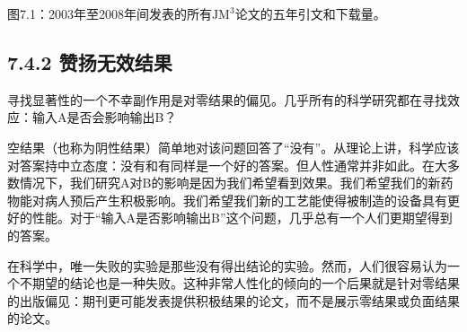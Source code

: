 图7.1：2003年至2008年间发表的所有$\mathrm{JM}^{3}$论文的五年引文和下载量。

\subsection*{7.4.2 赞扬无效结果}
寻找显著性的一个不幸副作用是对零结果的偏见。几乎所有的科学研究都在寻找效应：输入A是否会影响输出B？

空结果（也称为阴性结果）简单地对该问题回答了“没有”。从理论上讲，科学应该对答案持中立态度：没有和有同样是一个好的答案。但人性通常并非如此。在大多数情况下，我们研究A对B的影响是因为我们希望看到效果。我们希望我们的新药物能对病人预后产生积极影响。我们希望我们新的工艺能使得被制造的设备具有更好的性能。对于“输入A是否影响输出B”这个问题，几乎总有一个人们更期望得到的答案。

在科学中，唯一失败的实验是那些没有得出结论的实验。然而，人们很容易认为一个不期望的结论也是一种失败。这种非常人性化的倾向的一个后果就是针对零结果的出版偏见：期刊更可能发表提供积极结果的论文，而不是展示零结果或负面结果的论文。

